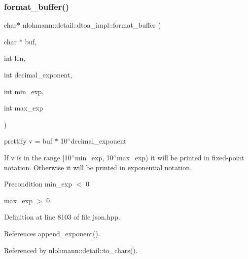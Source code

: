 \subsubsection{\texorpdfstring{format\+\_\+buffer()}{format\_buffer()}}
{\footnotesize\ttfamily char$\ast$ nlohmann\+::detail\+::dtoa\+\_\+impl\+::format\+\_\+buffer (\begin{DoxyParamCaption}\item[{char $\ast$}]{buf,  }\item[{int}]{len,  }\item[{int}]{decimal\+\_\+exponent,  }\item[{int}]{min\+\_\+exp,  }\item[{int}]{max\+\_\+exp }\end{DoxyParamCaption})\hspace{0.3cm}{\ttfamily [inline]}}



prettify v = buf $\ast$ 10$^\wedge$decimal\+\_\+exponent 

If v is in the range \mbox{[}10$^\wedge$min\+\_\+exp, 10$^\wedge$max\+\_\+exp) it will be printed in fixed-\/point notation. Otherwise it will be printed in exponential notation.

\begin{DoxyPrecond}{Precondition}
min\+\_\+exp $<$ 0 

max\+\_\+exp $>$ 0 
\end{DoxyPrecond}


Definition at line 8103 of file json.\+hpp.



References append\+\_\+exponent().



Referenced by nlohmann\+::detail\+::to\+\_\+chars().


